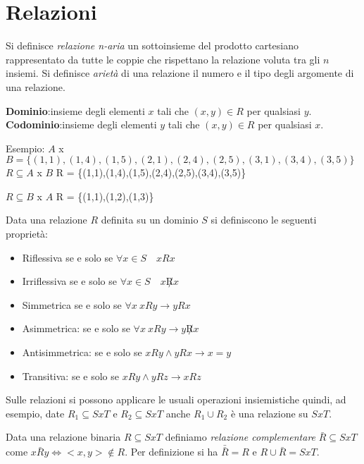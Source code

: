 \chapter{Relazioni}
Si definisce \textit{relazione n-aria} un sottoinsieme del prodotto cartesiano
rappresentato da tutte le coppie che rispettano la relazione voluta tra gli $n$ insiemi.
Si definisce \textit{arietà} di una relazione il numero e il tipo degli argomente
di una relazione.

\textbf{Dominio}:insieme degli elementi $x$ tali che $(x,y) \in R$ per qualsiasi $y$.
\textbf{Codominio}:insieme degli elementi $y$ tali che $(x,y) \in R$ per qualsiasi $x$.

Esempio:\newline
$A$ x $B = \{(1,1),(1,4),(1,5),(2,1),(2,4),(2,5),(3,1),(3,4),(3,5)\} $ \newline
$R \subseteq A$ x $B$\newline
R = \{(1,1),(1,4),(1,5),(2,4),(2,5),(3,4),(3,5)\}

$R \subseteq B$ x $A$ \newline
R = \{(1,1),(1,2),(1,3)\}

Data una relazione $R$ definita su un dominio $S$ si definiscono le seguenti proprietà:
\begin{itemize}
  \item Riflessiva se e solo se $\forall x \in S \quad xRx$
  \item Irriflessiva se e solo se $\forall x \in S \quad x \not R x$
  \item Simmetrica se e solo se $\forall x \ xRy \rightarrow yRx$
  \item Asimmetrica: se e solo se $\forall x \ xRy \rightarrow y \not R x$
  \item Antisimmetrica: se e solo se $xRy \land yRx \rightarrow x = y$
  \item Transitiva: se e solo se $xRy \land yRz \rightarrow xRz$
\end{itemize}

Sulle relazioni si possono applicare le usuali operazioni insiemistiche quindi, ad esempio,
date $R_1 \subseteq S x T$ e $R_2 \subseteq S x T$ anche $R_1 \cup R_2$ è una relazione su $S x T$.

Data una relazione binaria $R \subseteq S x T$ definiamo \emph{relazione complementare}
$\bar{R} \subseteq S x T$ come $x \bar{R} y \iff <x,y> \not \in R$.
Per definizione si ha $\bar{\bar{R}} = R$ e $R \cup \bar{R} = S x T$.

